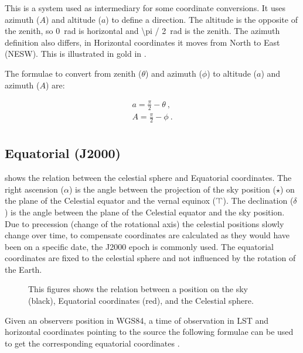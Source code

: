 This is a system used as intermediary for some coordinate conversions.
It uses azimuth ($A$) and altitude ($a$) to define a direction. The
altitude is the opposite of the zenith, so \SI{0}{\radian} is horizontal
and \SI{\pi / 2}{\radian} is the zenith. The azimuth definition also
differs, in Horizontal coordinates it moves from North to East (NESW).
This is illustrated in gold in .

The formulae to convert from zenith ($\theta$) and azimuth ($\phi$) to
altitude ($a$) and azimuth ($A$) are:

\begin{equation}
    \begin{array}{l}
        a = \frac{\pi}{2} - \theta \ , \\
        A = \frac{\pi}{2} - \phi \ . \\
    \end{array}
\end{equation}


\subsection{Equatorial (J2000)}

 shows the relation between the celestial sphere
and Equatorial coordinates. The right ascension ($\alpha$) is the angle
between the projection of the sky position ($\star$) on the plane of the
Celestial equator and the vernal equinox ($\vernal$). The declination
($\delta$) is the angle between the plane of the Celestial equator and
the sky position. Due to precession (change of the rotational axis) the
celestial positions slowly change over time, to compensate coordinates
are calculated as they would have been on a specific date, the J2000
epoch is commonly used. The equatorial coordinates are fixed to the
celestial sphere and not influenced by the rotation of the Earth.

\begin{figure}
    \centering
    
    \caption{This figures shows the relation between a position on the
             sky (black), Equatorial coordinates (red), and the
             Celestial sphere.}
    \label{fig:celestial}
\end{figure}

Given an observers position in WGS84, a time of observation in LST and
horizontal coordinates pointing to the source the following formulae can
be used to get the corresponding equatorial coordinates \cite[p.
37]{duffet-smith:1990aa}.

